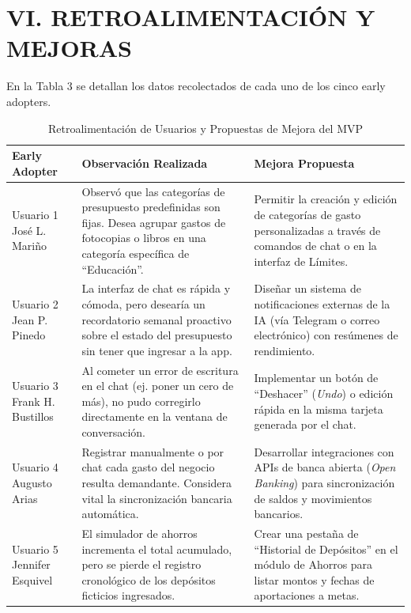 \documentclass[12pt]{article}
\begin{document}
\newpage

\section{VI. RETROALIMENTACIÓN Y MEJORAS}

En la Tabla 3 se detallan los datos recolectados de cada uno de los cinco early adopters.

\begin{table}[H]
\centering
\singlespacing
\caption{Retroalimentación de Usuarios y Propuestas de Mejora del MVP}
\label{tab:retroalimentacion_mejoras}
\begin{tabular}{p{3.5cm}p{5.8cm}p{5.9cm}}
\toprule
\textbf{Early Adopter} & \textbf{Observación Realizada} & \textbf{Mejora Propuesta} \\
\midrule
Usuario 1 \newline José L. Mariño & Observó que las categorías de presupuesto predefinidas son fijas. Desea agrupar gastos de fotocopias o libros en una categoría específica de ``Educación''. & Permitir la creación y edición de categorías de gasto personalizadas a través de comandos de chat o en la interfaz de Límites. \\
\addlinespace
Usuario 2 \newline Jean P. Pinedo & La interfaz de chat es rápida y cómoda, pero desearía un recordatorio semanal proactivo sobre el estado del presupuesto sin tener que ingresar a la app. & Diseñar un sistema de notificaciones externas de la IA (vía Telegram o correo electrónico) con resúmenes de rendimiento. \\
\addlinespace
Usuario 3 \newline Frank H. Bustillos & Al cometer un error de escritura en el chat (ej. poner un cero de más), no pudo corregirlo directamente en la ventana de conversación. & Implementar un botón de ``Deshacer'' (\textit{Undo}) o edición rápida en la misma tarjeta generada por el chat. \\
\addlinespace
Usuario 4 \newline Augusto Arias & Registrar manualmente o por chat cada gasto del negocio resulta demandante. Considera vital la sincronización bancaria automática. & Desarrollar integraciones con APIs de banca abierta (\textit{Open Banking}) para sincronización de saldos y movimientos bancarios. \\
\addlinespace
Usuario 5 \newline Jennifer Esquivel & El simulador de ahorros incrementa el total acumulado, pero se pierde el registro cronológico de los depósitos ficticios ingresados. & Crear una pestaña de ``Historial de Depósitos'' en el módulo de Ahorros para listar montos y fechas de aportaciones a metas. \\
\bottomrule
\end{tabular}
\end{table}
\end{document}
